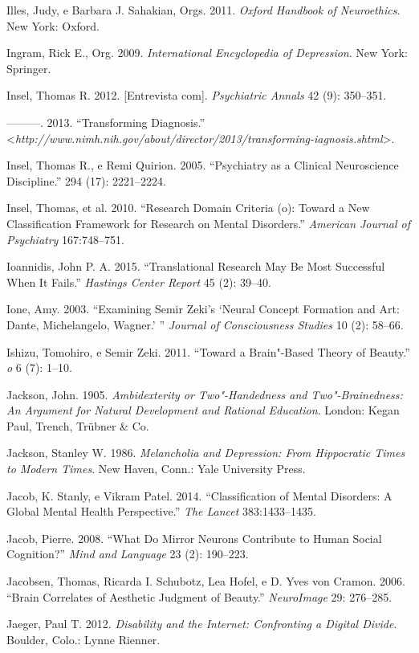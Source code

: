Illes, Judy, e Barbara J. Sahakian, Orgs. 2011. \emph{Oxford Handbook of
Neuroethics}. New York: Oxford.

Ingram, Rick E., Org. 2009. \emph{International Encyclopedia of
Depression}. New York: Springer.

Insel, Thomas R. 2012. {[}Entrevista com{]}. \emph{Psychiatric Annals}
42 (9): 350--351.

---------. 2013. ``Transforming Diagnosis.''
\textless{}\emph{http://www.nimh.nih.gov/about/director/2013/transforming-iagnosis.shtml}\textgreater{}.

Insel, Thomas R., e Remi Quirion. 2005. ``Psychiatry as a Clinical
Neuroscience Discipline.'' \emph{} 294 (17): 2221--2224.

Insel, Thomas, et al. 2010. ``Research Domain Criteria (o): Toward a
New Classification Framework for Research on Mental Disorders.''
\emph{American Journal of Psychiatry} 167:748--751.

Ioannidis, John P. A. 2015. ``Translational Research May Be Most
Successful When It Fails.'' \emph{Hastings Center Report} 45 (2):
39--40.

Ione, Amy. 2003. ``Examining Semir Zeki's `Neural Concept Formation and
Art: Dante, Michelangelo, Wagner.' '' \emph{Journal of Consciousness
Studies} 10 (2): 58--66.

Ishizu, Tomohiro, e Semir Zeki. 2011. ``Toward a Brain"-Based Theory of
Beauty.'' \emph{o} 6 (7): 1--10.

Jackson, John. 1905. \emph{Ambidexterity or Two"-Handedness and
Two"-Brainedness: An Argument for Natural Development and Rational
Education}. London: Kegan Paul, Trench, Trübner \& Co.

Jackson, Stanley W. 1986. \emph{Melancholia and Depression: From
Hippocratic Times to Modern Times}. New Haven, Conn.: Yale University
Press.

Jacob, K. Stanly, e Vikram Patel. 2014. ``Classification of Mental
Disorders: A Global Mental Health Perspective.'' \emph{The Lancet}
383:1433--1435.

Jacob, Pierre. 2008. ``What Do Mirror Neurons Contribute to Human Social
Cognition?'' \emph{Mind and Language} 23 (2): 190--223.

Jacobsen, Thomas, Ricarda I. Schubotz, Lea Hofel, e D. Yves von Cramon.
2006. ``Brain Correlates of Aesthetic Judgment of Beauty.''
\emph{NeuroImage} 29: 276--285.

Jaeger, Paul T. 2012. \emph{Disability and the Internet: Confronting a
Digital Divide}. Boulder, Colo.: Lynne Rienner.

